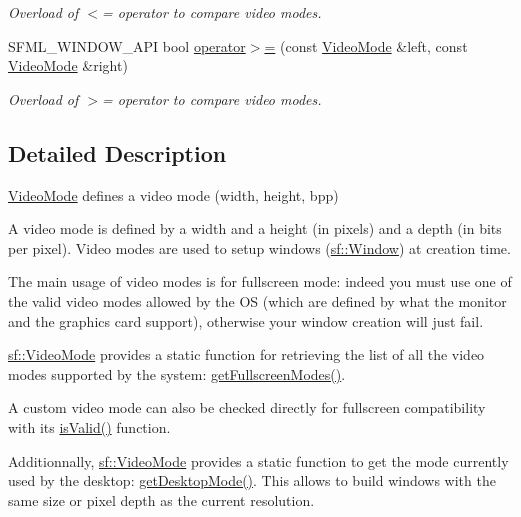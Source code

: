 \begin{DoxyCompactItemize}
\begin{DoxyCompactList}\small\item\em Overload of $<$= operator to compare video modes. \end{DoxyCompactList}\item 
S\-F\-M\-L\-\_\-\-W\-I\-N\-D\-O\-W\-\_\-\-A\-P\-I bool \hyperlink{classsf_1_1VideoMode_a7f7983e336203d34c9878c77fff60f1f}{operator$>$=} (const \hyperlink{classsf_1_1VideoMode}{Video\-Mode} \&left, const \hyperlink{classsf_1_1VideoMode}{Video\-Mode} \&right)
\begin{DoxyCompactList}\small\item\em Overload of $>$= operator to compare video modes. \end{DoxyCompactList}\end{DoxyCompactItemize}


\subsection{Detailed Description}
\hyperlink{classsf_1_1VideoMode}{Video\-Mode} defines a video mode (width, height, bpp) 

A video mode is defined by a width and a height (in pixels) and a depth (in bits per pixel). Video modes are used to setup windows (\hyperlink{classsf_1_1Window}{sf\-::\-Window}) at creation time.

The main usage of video modes is for fullscreen mode\-: indeed you must use one of the valid video modes allowed by the O\-S (which are defined by what the monitor and the graphics card support), otherwise your window creation will just fail.

\hyperlink{classsf_1_1VideoMode}{sf\-::\-Video\-Mode} provides a static function for retrieving the list of all the video modes supported by the system\-: \hyperlink{classsf_1_1VideoMode_a6815b9b3b35767d5b4563fbed4bfc67b}{get\-Fullscreen\-Modes()}.

A custom video mode can also be checked directly for fullscreen compatibility with its \hyperlink{classsf_1_1VideoMode_aa64ff5420dde3b31c24b9c4e2be9cd9c}{is\-Valid()} function.

Additionnally, \hyperlink{classsf_1_1VideoMode}{sf\-::\-Video\-Mode} provides a static function to get the mode currently used by the desktop\-: \hyperlink{classsf_1_1VideoMode_ac1be160a4342e6eafb2cb0e8c9b18d44}{get\-Desktop\-Mode()}. This allows to build windows with the same size or pixel depth as the current resolution.

